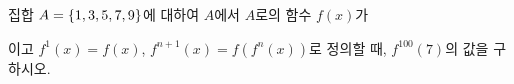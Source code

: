 집합 $A=\{1{,}\mkern3mu\mathopen{}3{,}\mkern3mu\mathopen{}5{,}\mkern3mu\mathopen{}7{,}\mkern3mu\mathopen{}9\}$에 대하여 $A$에서 $A$로의 함수 $f(x)$가\par\smallskip{}\par\smallskip\noindent 이고 $f^1(x)=f(x)$, $f^{n+1}(x)=f(f^n(x))$로 정의할 때, $f^{100}(7)$의 값을 구하시오.

